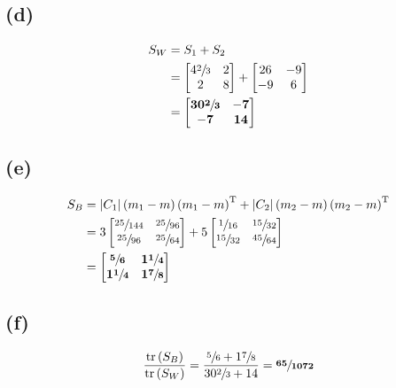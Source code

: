 \documentclass[12pt]{article}
\begin{document}
	\subsection*{(d)}
	\begingroup
	\addtolength{\jot}{1em}
	\begin{align*}
		S_W &= S_1 + S_2 \\
		&= \begin{bmatrix}
			4\sfrac{2}{3} & 2 \\
			2 & 8
		\end{bmatrix}
		+ \begin{bmatrix}
			26 & -9 \\
			-9 & 6
		\end{bmatrix} \\
		&= \begin{bmatrix}
			\mathbf{30\sfrac{2}{3}} & \mathbf{-7} \\
			\mathbf{-7} & \mathbf{14}
		\end{bmatrix}
	\end{align*}

	\subsection*{(e)}
	\begingroup
	\addtolength{\jot}{1em}
	\begin{align*}
		S_B &= \lvert C_1 \rvert \left(m_1-m\right)\left(m_1-m\right)^\textrm{T}
		+ \lvert C_2 \rvert \left(m_2-m\right)\left(m_2-m\right)^\textrm{T} \\
		&= 3 \begin{bmatrix}
			\sfrac{25}{144} & \sfrac{25}{96} \\
			\sfrac{25}{96} & \sfrac{25}{64}
		\end{bmatrix}
		+ 5 \begin{bmatrix}
			\sfrac{1}{16} & \sfrac{15}{32} \\
			\sfrac{15}{32} & \sfrac{45}{64}
		\end{bmatrix} \\
		&= \begin{bmatrix}
			\mathbf{\sfrac{5}{6}} & \mathbf{1\sfrac{1}{4}} \\
			\mathbf{1\sfrac{1}{4}} & \mathbf{1\sfrac{7}{8}}
		\end{bmatrix}
 	\end{align*}
	\endgroup

	\subsection*{(f)}
	\begingroup
	\addtolength{\jot}{1em}
	\begin{align*}
		\frac{\textrm{tr}\left(S_B\right)}{\textrm{tr}\left(S_W\right)}
		= \frac{\sfrac{5}{6}+1\sfrac{7}{8}}{30\sfrac{2}{3}+14}
		= \mathbf{\sfrac{65}{1072}}
	\end{align*}
	\endgroup
\end{document}
